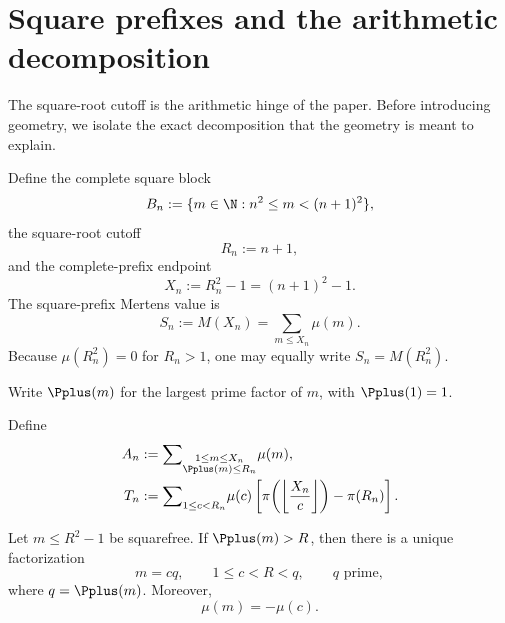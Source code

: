 \section{Square prefixes and the arithmetic decomposition}
\label{sec:arithmetic}

The square-root cutoff is the arithmetic hinge of the paper.  Before introducing geometry, we isolate the exact decomposition that the geometry is meant to explain.

Define the complete square block
\begin{equation}
 B_n:=\{m\in\N:n^2\le m<(n+1)^2\},
 \label{eq:block}
\end{equation}
the square-root cutoff
\begin{equation}
 R_n:=n+1,
 \label{eq:Rn}
\end{equation}
and the complete-prefix endpoint
\begin{equation}
 X_n:=R_n^2-1=(n+1)^2-1.
 \label{eq:Xn}
\end{equation}
The square-prefix Mertens value is
\begin{equation}
 S_n:=M(X_n)=\sum_{m\le X_n}\mu(m).
 \label{eq:Sn}
\end{equation}
Because $\mu(R_n^2)=0$ for $R_n>1$, one may equally write $S_n=M(R_n^2)$.

Write $\Pplus(m)$ for the largest prime factor of $m$, with $\Pplus(1)=1$.

\begin{definition}
\label{def:AT}
Define
\begin{align}
 A_n
 &:={\sum}_{\substack{1\le m\le X_n\\\Pplus(m)\le R_n}}\mu(m),
 \label{eq:An}\\
 T_n
 &:={\sum}_{1\le c<R_n}\mu(c)
 \left[
 \pi\!\left(\left\lfloor\frac{X_n}{c}\right\rfloor\right)-\pi(R_n)
 \right].
 \label{eq:Tn}
\end{align}
\end{definition}

\begin{lemma}
\label{lem:one-large}
Let $m\le R^2-1$ be squarefree.  If $\Pplus(m)>R$, then there is a unique factorization
\begin{equation}
 m=cq,
 \qquad
 1\le c<R<q,
 \qquad
 q\text{ prime},
 \label{eq:one-large}
\end{equation}
where $q=\Pplus(m)$.  Moreover,
\begin{equation}
 \mu(m)=-\mu(c).
 \label{eq:mobius-peel}
\end{equation}
\end{lemma}

